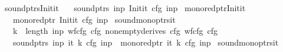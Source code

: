 \begin{isabellebody}
%
\isatagproof
%
\endisatagproof
{\isafoldproof}%
%
\isadelimproof
\isanewline
%
\endisadelimproof
{}\isamarkupfalse%
\ sound{\isacharunderscore}{\kern0pt}ptrs{\isacharunderscore}{\kern0pt}Init{\isacharunderscore}{\kern0pt}it{\isacharcolon}{\kern0pt}\isanewline
\ \ \ {\isachardoublequoteopen}sound{\isacharunderscore}{\kern0pt}ptrs\ inp\ {\isacharparenleft}{\kern0pt}Init{\isacharunderscore}{\kern0pt}it\ cfg\ inp{\isacharparenright}{\kern0pt}{\isachardoublequoteclose}%
\isadelimproof
%
\endisadelimproof
%
\isatagproof
%
\endisatagproof
{\isafoldproof}%
%
\isadelimproof
\isanewline
%
\endisadelimproof
{}\isamarkupfalse%
\ mono{\isacharunderscore}{\kern0pt}red{\isacharunderscore}{\kern0pt}ptr{\isacharunderscore}{\kern0pt}Init{\isacharunderscore}{\kern0pt}it{\isacharcolon}{\kern0pt}\isanewline
\ \ \ {\isachardoublequoteopen}mono{\isacharunderscore}{\kern0pt}red{\isacharunderscore}{\kern0pt}ptr\ {\isacharparenleft}{\kern0pt}Init{\isacharunderscore}{\kern0pt}it\ cfg\ inp{\isacharparenright}{\kern0pt}{\isachardoublequoteclose}%
\isadelimproof
%
\endisadelimproof
%
\isatagproof
%
\endisatagproof
{\isafoldproof}%
%
\isadelimproof
\isanewline
%
\endisadelimproof
{}\isamarkupfalse%
\ sound{\isacharunderscore}{\kern0pt}mono{\isacharunderscore}{\kern0pt}ptrs{\isacharunderscore}{\kern0pt}{\isasymI}{\isacharunderscore}{\kern0pt}it{\isacharcolon}{\kern0pt}\isanewline
\ \ \ {\isachardoublequoteopen}k\ {\isasymle}\ length\ inp{\isachardoublequoteclose}\ {\isachardoublequoteopen}wf{\isacharunderscore}{\kern0pt}cfg\ cfg{\isachardoublequoteclose}\ {\isachardoublequoteopen}nonempty{\isacharunderscore}{\kern0pt}derives\ cfg{\isachardoublequoteclose}\ {\isachardoublequoteopen}wf{\isacharunderscore}{\kern0pt}cfg\ cfg{\isachardoublequoteclose}\isanewline
\ \ \ {\isachardoublequoteopen}sound{\isacharunderscore}{\kern0pt}ptrs\ inp\ {\isacharparenleft}{\kern0pt}{\isasymI}{\isacharunderscore}{\kern0pt}it\ k\ cfg\ inp{\isacharparenright}{\kern0pt}\ {\isasymand}\ mono{\isacharunderscore}{\kern0pt}red{\isacharunderscore}{\kern0pt}ptr\ {\isacharparenleft}{\kern0pt}{\isasymI}{\isacharunderscore}{\kern0pt}it\ k\ cfg\ inp{\isacharparenright}{\kern0pt}{\isachardoublequoteclose}%
\isadelimproof
%
\endisadelimproof
%
\isatagproof
%
\endisatagproof
{\isafoldproof}%
%
\isadelimproof
\isanewline
%
\endisadelimproof
{}\isamarkupfalse%
\ sound{\isacharunderscore}{\kern0pt}mono{\isacharunderscore}{\kern0pt}ptrs{\isacharunderscore}{\kern0pt}{\isasymII}{\isacharunderscore}{\kern0pt}it{\isacharcolon}{\kern0pt}\isanewline

\end{isabellebody}
